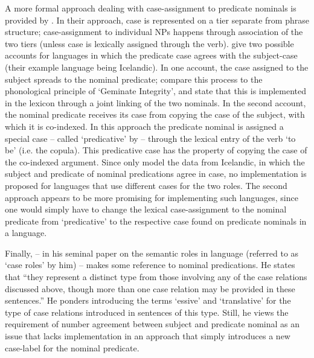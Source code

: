A more formal approach dealing with case-assignment to predicate nominals is provided by \citet[243--246]{Yip:1987}.
In their approach, case is represented on a tier separate from phrase structure; case-assignment to individual NPs happens through association of the two tiers (unless case is lexically assigned through the verb). 
\citeauthor{Yip:1987} give two possible accounts for languages in which the predicate case agrees with the subject-case (their example language being Icelandic). 
In one account, the case assigned to the subject spreads to the nominal predicate; \citeauthor{Yip:1987} compare this process to the phonological principle of `Geminate Integrity', and state that this is implemented in the lexicon through a joint linking of the two nominals.  
In the second account, the nominal predicate receives its case from copying the case of the subject, with which it is co-indexed. 
In this approach the predicate nominal is assigned a special case -- called `predicative' by \citet{Yip:1987} --  through the lexical entry of the verb `to be' (i.e. the copula). 
This predicative case has the property of copying the case of the co-indexed argument.  
Since \citet{Yip:1987} only model the data from Icelandic, in which the subject and predicate of nominal predications agree in case, no implementation is proposed for languages that use different cases for the two roles. 
The second approach appears to be more promising for implementing such languages, since one would simply have to change the lexical case-assignment to the nominal predicate from `predicative' to the respective case found on predicate nominals in a language.

Finally, \citet[84]{Fillmore:1969} -- in his seminal paper on the semantic roles in language (referred to as `case roles' by him) -- makes some reference to nominal predications. 
He states that ``they represent a distinct type from those involving any of the case relations discussed above, though more than one case relation may be provided in these sentences.'' 
He ponders introducing the terms `essive' and `translative' for the type of case relations introduced in sentences of this type. 
Still, he views the requirement of number agreement between subject and predicate nominal as an issue that lacks implementation in an approach that simply introduces a new case-label for the nominal predicate. 

